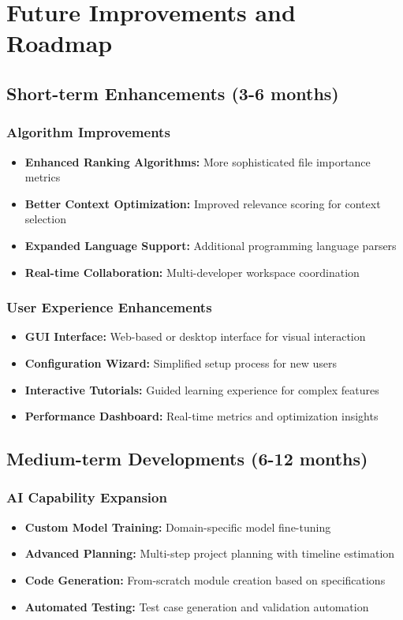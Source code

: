 \documentclass[12pt,a4paper]{article}
\begin{document}
\section{Future Improvements and Roadmap}

\subsection{Short-term Enhancements (3-6 months)}

\subsubsection{Algorithm Improvements}
\begin{itemize}
    \item \textbf{Enhanced Ranking Algorithms:} More sophisticated file importance metrics
    \item \textbf{Better Context Optimization:} Improved relevance scoring for context selection
    \item \textbf{Expanded Language Support:} Additional programming language parsers
    \item \textbf{Real-time Collaboration:} Multi-developer workspace coordination
\end{itemize}

\subsubsection{User Experience Enhancements}
\begin{itemize}
    \item \textbf{GUI Interface:} Web-based or desktop interface for visual interaction
    \item \textbf{Configuration Wizard:} Simplified setup process for new users
    \item \textbf{Interactive Tutorials:} Guided learning experience for complex features
    \item \textbf{Performance Dashboard:} Real-time metrics and optimization insights
\end{itemize}

\subsection{Medium-term Developments (6-12 months)}

\subsubsection{AI Capability Expansion}
\begin{itemize}
    \item \textbf{Custom Model Training:} Domain-specific model fine-tuning
    \item \textbf{Advanced Planning:} Multi-step project planning with timeline estimation
    \item \textbf{Code Generation:} From-scratch module creation based on specifications
    \item \textbf{Automated Testing:} Test case generation and validation automation
\end{itemize}
\end{document}
